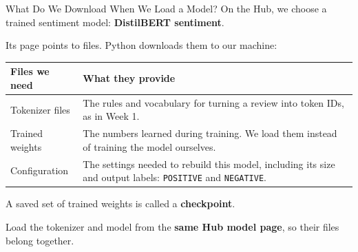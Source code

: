 \documentclass[aspectratio=169]{beamer}
\begin{document}
\begin{frame}{What Do We Download When We Load a Model?}
  \small On the Hub, we choose a trained sentiment model: \textbf{DistilBERT sentiment}.
  \par\vspace{0.3em}
  Its page points to files. Python downloads them to our machine:
  \par\vspace{0.6em}
  \renewcommand{\arraystretch}{1.45}
  \begin{tabular}{@{}p{3.5cm}p{8.7cm}@{}}
    \toprule
    \textbf{Files we need} & \textbf{What they provide} \\
    \midrule
    Tokenizer files & The rules and vocabulary for turning a review into token IDs, as in Week 1. \\
    Trained weights & The numbers learned during training. We load them instead of training the model ourselves. \\
    Configuration & The settings needed to rebuild this model, including its size and output labels: \texttt{POSITIVE} and \texttt{NEGATIVE}. \\
    \bottomrule
  \end{tabular}\par
  \vspace{0.6em}
  A saved set of trained weights is called a \textbf{checkpoint}.
  \par\vspace{0.3em}
  Load the tokenizer and model from the \textbf{same Hub model page}, so their files belong together.
\end{frame}
\end{document}
